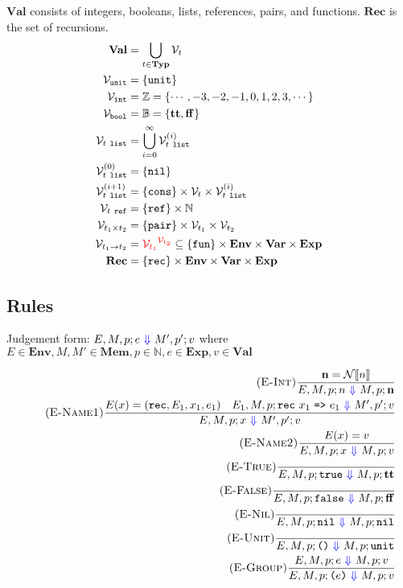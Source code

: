 \documentclass{article}
\newcommand{\btt}{\mathbf{tt}}
\newcommand{\bff}{\mathbf{ff}}
\newcommand{\To}{\ \textcolor{blue}{\Downarrow}\ }
\begin{document}
$\mathbf{Val}$ consists of integers, booleans, lists, references, pairs, and functions.  $\mathbf{Rec}$ is the set of recursions.
\begin{align*}
  \mathbf{Val} &= \bigcup_{t\in\mathbf{Typ}}\mathcal{V}_t \\
  \mathcal{V}_\texttt{unit} &= \{ \texttt{unit} \} \\
  \mathcal{V}_\texttt{int} &= \mathbb{Z} = \{\cdots,-3,-2,-1,0,1,2,3,\cdots\}\\
  \mathcal{V}_\texttt{bool} &= \mathbb{B} = \{\btt,\bff\} \\
  \mathcal{V}_{t\ \texttt{list}} &= \bigcup_{i=0}^{\infty}\mathcal{V}_{t\ \texttt{list}}^{(i)} \\
  \mathcal{V}_{t\ \texttt{list}}^{(0)} &= \{ \texttt{nil} \} \\
  \mathcal{V}_{t\ \texttt{list}}^{(i+1)} &= \{\texttt{cons}\}\times\mathcal{V}_t\times\mathcal{V}_{t\ \texttt{list}}^{(i)} \\
  \mathcal{V}_{t\ \texttt{ref}} &= \{\texttt{ref}\}\times\mathbb{N} \\
  \mathcal{V}_{t_1\times t_2} &= \{\texttt{pair}\}\times\mathcal{V}_{t_1}\times\mathcal{V}_{t_2} \\
  \mathcal{V}_{t_1\to t_2} &= \textcolor{red}{{\mathcal{V}_{t_1}}^{\mathcal{V}_{t_2}}} \subseteq \{\texttt{fun}\}\times\mathbf{Env}\times\mathbf{Var}\times\mathbf{Exp} \\
  \mathbf{Rec} &= \{\texttt{rec}\}\times\mathbf{Env}\times\mathbf{Var}\times\mathbf{Exp}
\end{align*}

\subsection{Rules}

Judgement form: $E,M,p;e\To M',p';v$ where $E\in\mathbf{Env}, M,M'\in\mathbf{Mem}, p\in\mathbb{N}, e\in\mathbf{Exp}, v\in\mathbf{Val}$

\begin{align*}
\tag{\sc E-Int}
\frac{\mathbf{n}=\mathcal{N}\llbracket n\rrbracket}
{E,M,p;n\To M,p;\mathbf{n}}
\\
\tag{\sc E-Name1}
\frac{E(x)=(\texttt{rec},E_1,x_1,e_1) \quad E_1,M,p;\texttt{rec}\ x_1\ \texttt{=>}\ e_1\To M',p';v}
{E,M,p;x\To M',p';v}
\\
\tag{\sc E-Name2}
\frac{E(x)=v}
{E,M,p;x\To M,p;v}
\\
\tag{\sc E-True}
\frac{}
{E,M,p;\texttt{true}\To M,p;\btt}
\\
\tag{\sc E-False}
\frac{}
{E,M,p;\texttt{false}\To M,p;\bff}
\\
\tag{\sc E-Nil}
\frac{}
{E,M,p;\texttt{nil}\To M,p;\texttt{nil}}
\\
\tag{\sc E-Unit}
\frac{}
{E,M,p;\texttt{()}\To M,p;\texttt{unit}}
\\
\tag{\sc E-Group}
\frac{E,M,p;e\To M,p;v}
{E,M,p;\texttt{(}e\texttt{)}\To M,p;v}
\end{align*}
\end{document}
